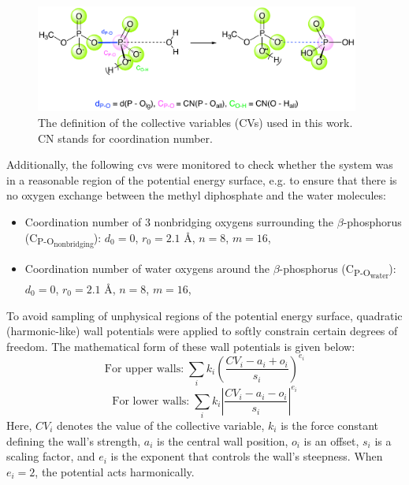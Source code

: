 \begin{figure}[b!]
    \centering
    \includegraphics[width=0.95\textwidth]{Figures/3_Computational_details/methods_collective_variables.pdf}
    \caption{The definition of the collective variables (CVs) used in this work. CN stands for coordination number.}
    \label{fig:collective_variables}
\end{figure}

Additionally, the following \acp{cv} were monitored to check whether the system was in a reasonable region of the potential energy surface, e.g. to ensure that there is no oxygen exchange between the methyl diphosphate and the water molecules:
\begin{itemize}
    \item Coordination number of 3 nonbridging oxygens surrounding the $\beta$-phosphorus (C\textsubscript{P-O\textsubscript{nonbridging}}): $d_0 = 0$, $r_0 = 2.1$ \AA, $n = 8$, $m = 16$,
    \item Coordination number of water oxygens around the $\beta$-phosphorus (C\textsubscript{P-O\textsubscript{water}}): $d_0 = 0$, $r_0 = 2.1$ \AA, $n = 8$, $m = 16$,
\end{itemize}

To avoid sampling of unphysical regions of the potential energy surface, quadratic (harmonic-like) wall potentials were applied to softly constrain certain degrees of freedom. The mathematical form of these wall potentials is given below:
\begin{equation}
    \text{For upper walls:} \; \sum_i k_i \left( \frac{CV_i - a_i + o_i}{s_i} \right)^{e_i}
    \label{eq:upper_wall}
\end{equation}
\begin{equation}
    \text{For lower walls:} \; \sum_i k_i \left| \frac{CV_i - a_i - o_i}{s_i} \right|^{e_i}
    \label{eq:lower_wall}
\end{equation}
Here, $CV_i$ denotes the value of the collective variable, $k_i$ is the force constant defining the wall's strength, $a_i$ is the central wall position, $o_i$ is an offset, $s_i$ is a scaling factor, and $e_i$ is the exponent that controls the wall's steepness. When $e_i = 2$, the potential acts harmonically.

